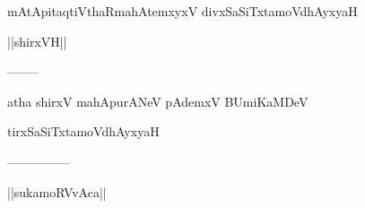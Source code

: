 \documentclass{article}
\begin{document}
\begin{center}
mAtApitaqtiVthaRmahAtemxyxV divxSaSiTxtamoVdhAyxyaH
\end{center}

\begin{center}
||shirxVH||
\end{center}

\begin{center}
--------
\end{center}

\begin{center}
atha shirxV mahApurANeV pAdemxV BUmiKaMDeV
\end{center}

\begin{center}
tirxSaSiTxtamoVdhAyxyaH
\end{center}

\begin{center}

---------------
\end{center}

\begin{center}
||sukamoRVvAca||
\end{center}
\end{document}
